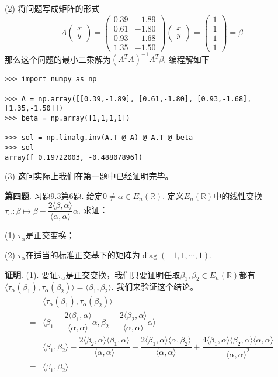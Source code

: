 (2) 将问题写成矩阵的形式
$$A\begin{pmatrix}
x \\ y
\end{pmatrix} = \begin{pmatrix}
0.39 & -1.89 \\ 0.61 & -1.80 \\ 0.93 & -1.68 \\ 1.35 & -1.50
\end{pmatrix}
\begin{pmatrix}
x \\ y
\end{pmatrix} = 
\begin{pmatrix}
1 \\ 1 \\ 1 \\ 1
\end{pmatrix} = \beta
$$
那么这个问题的最小二乘解为$(A^TA)^{-1}A^T\beta$, 编程解如下
\begin{lstlisting}
>>> import numpy as np

>>> A = np.array([[0.39,-1.89], [0.61,-1.80], [0.93,-1.68], [1.35,-1.50]])
>>> beta = np.array([1,1,1,1])

>>> sol = np.linalg.inv(A.T @ A) @ A.T @ beta
>>> sol
array([ 0.19722003, -0.48807896])
\end{lstlisting}

(3) 这问实际上我们在第一题中已经证明完毕。


\newpageorvspace


{\bf 第四题}. 习题9.3第6题. 给定$0 \neq \alpha \in E_n(\mathbb{R})$. 定义$E_n(\mathbb{R})$中的线性变换$\tau_{\alpha}: \beta \mapsto \beta - \dfrac{2\langle \beta, \alpha \rangle}{\langle \alpha, \alpha \rangle} \alpha$, 求证：

(1) $\tau_{\alpha}$是正交变换；

(2) $\tau_{\alpha}$在适当的标准正交基下的矩阵为$\operatorname{diag}(-1, 1, \cdots, 1)$.


{\bf 证明}. (1). 要证$\tau_{\alpha}$是正交变换，我们只要证明任取$\beta_1, \beta_2 \in E_n(\mathbb{R})$都有$\langle \tau_{\alpha}(\beta_1), \tau_{\alpha}(\beta_2) \rangle = \langle \beta_1, \beta_2 \rangle$. 我们来验证这个结论。
\begin{align*}
& \langle \tau_{\alpha}(\beta_1), \tau_{\alpha}(\beta_2) \rangle \\
= & \langle \beta_1 - \dfrac{2\langle \beta_1, \alpha \rangle}{\langle \alpha, \alpha \rangle} \alpha, \beta_2 - \dfrac{2\langle \beta_2, \alpha \rangle}{\langle \alpha, \alpha \rangle} \alpha  \rangle \\
= & \langle \beta_1, \beta_2 \rangle - \dfrac{2\langle \beta_2, \alpha \rangle \langle \beta_1, \alpha \rangle}{\langle \alpha, \alpha \rangle}- \dfrac{2\langle \beta_1, \alpha \rangle \langle \alpha, \beta_2 \rangle}{\langle \alpha, \alpha \rangle} + \dfrac{4\langle \beta_1, \alpha \rangle \langle \beta_2, \alpha \rangle \langle \alpha, \alpha \rangle}{\langle \alpha, \alpha \rangle^2} \\
= & \langle \beta_1, \beta_2 \rangle
\end{align*}

